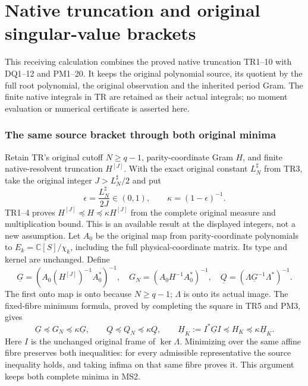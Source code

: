 \endgroup

\clearpage\begingroup
\part*{Native truncation and original singular-value brackets}
\newcommand{\pnativediag}{\operatorname{diag}}
\newcommand{\pnativerank}{\operatorname{rank}}

This receiving calculation combines the proved native truncation
TR1--10 with DQ1--12 and PM1--20. It keeps the original polynomial
source, its quotient by the full root polynomial, the original
observation and the inherited period Gram. The finite native
integrals in TR are retained as their actual integrals; no moment
evaluation or numerical certificate is asserted here.

\section{The same source bracket through both original minima}
Retain TR's original cutoff $N\ge q-1$, parity-coordinate Gram $H$,
and finite native-resolvent truncation $H^{[J]}$. With the exact
original constant $L_N^\sharp$ from TR3, take the original integer
$J>L_N^\sharp/2$ and put
\[
 \epsilon=\frac{L_N^\sharp}{2J}\in(0,1),\qquad
 \kappa=(1-\epsilon)^{-1}.
 \tag{MS1}
\]
TR1--4 proves $H^{[J]}\preceq H\preceq\kappa H^{[J]}$ from
the complete original measure and multiplication bound. This is an
available result at the displayed integers, not a new assumption.
Let $A_0$ be the original map from parity-coordinate polynomials to
$E_k=\mathbb C[S]/\chi_k$, including the full physical-coordinate
matrix. Its type and kernel are unchanged. Define
\[
 \underline G=(A_0(H^{[J]})^{-1}A_0^*)^{-1},\quad
 G_N=(A_0H^{-1}A_0^*)^{-1},\quad
 \underline Q=(\Lambda\underline G^{-1}\Lambda^*)^{-1}.
 \tag{MS2}
\]
The first onto map is onto because $N\ge q-1$; $\Lambda$ is onto
its actual image. The fixed-fibre minimum formula, proved by
completing the square in TR5 and PM3, gives
\[
 \underline G\preceq G_N\preceq\kappa\underline G,\qquad
 \underline Q\preceq Q_N\preceq\kappa\underline Q,\qquad
 \underline H_K:=I^*\underline GI\preceq H_K
                           \preceq\kappa\underline H_K.
 \tag{MS3}
\]
Here $I$ is the unchanged original frame of $\ker\Lambda$.
Minimizing over the same affine fibre preserves both inequalities:
for every admissible representative the source inequality holds,
and taking infima on that same fibre proves it. This argument
keeps both complete minima in MS2.

